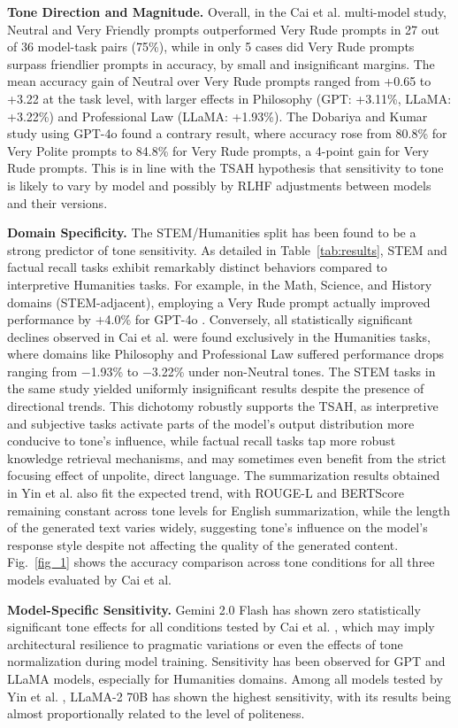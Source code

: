 \documentclass[conference]{IEEEtran}
\begin{document}
\textbf{Tone Direction and Magnitude.} Overall, in the Cai et al. \cite{b8} multi-model study, Neutral and Very Friendly prompts outperformed Very Rude prompts in 27 out of 36 model-task pairs (75\%), while in only 5 cases did Very Rude prompts surpass friendlier prompts in accuracy, by small and insignificant margins. The mean accuracy gain of Neutral over Very Rude prompts ranged from +0.65 to +3.22 at the task level, with larger effects in Philosophy (GPT: +3.11\%, LLaMA: +3.22\%) and Professional Law (LLaMA: +1.93\%). The Dobariya and Kumar study \cite{b7} using GPT-4o found a contrary result, where accuracy rose from 80.8\% for Very Polite prompts to 84.8\% for Very Rude prompts, a 4-point gain for Very Rude prompts. This is in line with the TSAH hypothesis that sensitivity to tone is likely to vary by model and possibly by RLHF adjustments between models and their versions.

\textbf{Domain Specificity.} The STEM/Humanities split has been found to be a strong predictor of tone sensitivity. As detailed in Table~\ref{tab:results}, STEM and factual recall tasks exhibit remarkably distinct behaviors compared to interpretive Humanities tasks. For example, in the Math, Science, and History domains (STEM-adjacent), employing a Very Rude prompt actually improved performance by $+$4.0\% for GPT-4o \cite{b7}. Conversely, all statistically significant declines observed in Cai et al. \cite{b8} were found exclusively in the Humanities tasks, where domains like Philosophy and Professional Law suffered performance drops ranging from $-$1.93\% to $-$3.22\% under non-Neutral tones. The STEM tasks in the same study yielded uniformly insignificant results despite the presence of directional trends. This dichotomy robustly supports the TSAH, as interpretive and subjective tasks activate parts of the model's output distribution more conducive to tone's influence, while factual recall tasks tap more robust knowledge retrieval mechanisms, and may sometimes even benefit from the strict focusing effect of unpolite, direct language. The summarization results obtained in Yin et al. \cite{b6} also fit the expected trend, with ROUGE-L and BERTScore remaining constant across tone levels for English summarization, while the length of the generated text varies widely, suggesting tone's influence on the model's response style despite not affecting the quality of the generated content. Fig.~\ref{fig_1} shows the accuracy comparison across tone conditions for all three models evaluated by Cai et al.

\textbf{Model-Specific Sensitivity.} Gemini 2.0 Flash has shown zero statistically significant tone effects for all conditions tested by Cai et al. \cite{b8}, which may imply architectural resilience to pragmatic variations or even the effects of tone normalization during model training. Sensitivity has been observed for GPT and LLaMA models, especially for Humanities domains. Among all models tested by Yin et al. \cite{b6}, LLaMA-2 70B has shown the highest sensitivity, with its results being almost proportionally related to the level of politeness.
\end{document}
